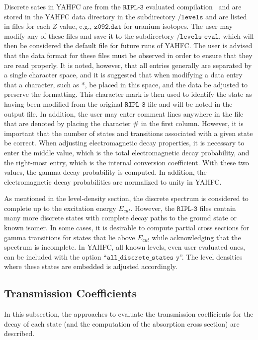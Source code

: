 \documentclass[
10pt,
showpacs,preprintnumbers,footinbib,
amsfonts,amsmath,amssymb,
aps,
prc,twocolumn,groupedaddress,superscriptaddress,
showkeys,
nofootinbib
]{revtex4-1}
\begin{document}
Discrete sates in YAHFC are from the ${\texttt{RIPL-3}}$ evaluated compilation~\cite{Capote:2009,RIPL-3} and are stored in the YAHFC data directory in the subdirectory ${\texttt{/levels}}$ and are listed in files for each $Z$ value, e.g., ${\texttt{z092.dat}}$ for uranium isotopes. The user may modify any of these files and save it to the subdirectory ${\texttt{/levels-eval}}$, which will then be considered the default file for future runs of YAHFC. The user is advised that the data format for these files must be observed in order to ensure that they are read properly. It is noted, however, that all entries generally are separated by a single character space, and it is suggested that when modifying a data entry that a character, such as *, be placed in this space, and the data be adjusted to preserve the formatting. This character mark is then used to identify the state as having been modified from the original ${\texttt{RIPL-3}}$ file and will be noted in the output file. In addition, the user may enter comment lines anywhere in the file that are denoted by placing the character \# in the first column. However, it is important that the number of states and transitions associated with a given state be correct. When adjusting electromagnetic decay properties, it is necessary to enter the middle value, which is the total electromagnetic decay probability, and the right-most entry, which is the internal conversion coefficient. With these two values, the gamma decay probability is computed. In addition, the electromagnetic decay probabilities are normalized to unity in YAHFC.

As mentioned in the level-density section, the discrete spectrum is considered to complete up to the excitation energy $E_{cut}$. However, the ${\texttt{RIPL-3}}$ files contain many more discrete states with complete decay paths to the ground state or known isomer. In some cases, it is desirable to compute partial cross sections for gamma transitions for states that lie above $E_{cut}$ while acknowledging that the spectrum is incomplete. In YAHFC, all known levels, even user evaluated ones, can be included with the option ``${\texttt{all\_discrete\_states y}}$''. The level densities where these states are embedded is adjusted accordingly.

\subsection{Transmission Coefficients}

In this subsection, the approaches to evaluate the transmission coefficients for the decay of each state (and the computation of the absorption cross section) are described.
\end{document}

